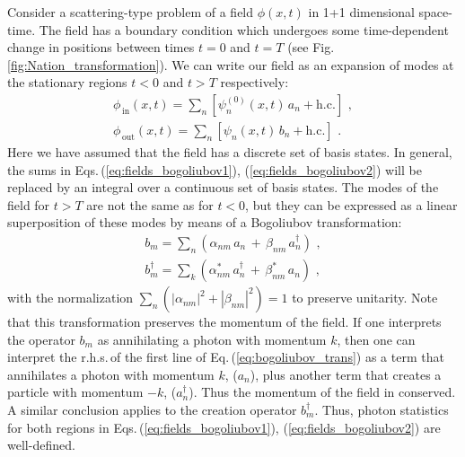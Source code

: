 Consider a scattering-type problem of a field $\phi(x,t)$ in 1+1 dimensional space-time. 
The field has a boundary condition which undergoes some time-dependent 
change in positions between times $t=0$ and $t=T$ (see Fig.\,\ref{fig:Nation_transformation}). We can write our field as an expansion 
of modes at the stationary regions $t<0$ and $t>T$ respectively:
%
\begin{gather}
    \phi_{\,\text{in}}(x,t) = \sum_n \left[ \psi_n^{(0)}(x,t) \, a_n + \text{h.c.}\right] \, \, ,\label{eq:fields_bogoliubov1}
    \\
    \phi_{\,\text{out}}(x,t) = \sum_n \left[ \psi_n(x,t) \, b_n + \text{h.c.}\right] \, \, .\label{eq:fields_bogoliubov2}
\end{gather}
%
Here we have assumed that the field has a discrete set of basis states. In general, the sums in 
Eqs.\,(\ref{eq:fields_bogoliubov1}), (\ref{eq:fields_bogoliubov2}) will be replaced by an integral over a continuous set of basis states. 
The modes of the field for $t>T$ are not the same as for $t<0$, but they can be expressed as a linear superposition of these 
modes by means of a Bogoliubov transformation:
%
\begin{equation}\label{eq:bogoliubov_trans}
    \begin{split}
    b_m = \sum_n \left(\alpha_{nm} \, a_n \, + \, \beta_{nm} \, a_n^{\dagger} \right) \, \, ,
    \\
    b_m^{\dagger} = \sum_k \left(\alpha_{nm}^* \, a_n^{\dagger} \, + \, \beta_{nm}^* \, a_n \right) \, \, ,
    \end{split}
\end{equation}
%
with the normalization $\sum_n \left(|\alpha_{nm}|^2 + |\beta_{nm}|^2\right) = 1$ to preserve unitarity.
Note that this transformation preserves the momentum of the field. If one interprets the operator $b_m$ as annihilating a photon 
with momentum $k$, then one can interpret the r.h.s.\,of the first line 
of Eq.\,(\ref{eq:bogoliubov_trans}) as a term that annihilates a photon 
with momentum $k$, ($a_n$), plus another term that creates a particle with momentum $-k$, ($a_n^{\dagger}$). Thus the momentum 
of the field in conserved. A similar conclusion applies to the creation operator $b_m^{\dagger}$.
Thus, photon statistics for both regions in Eqs.\,(\ref{eq:fields_bogoliubov1}), (\ref{eq:fields_bogoliubov2}) are well-defined.

